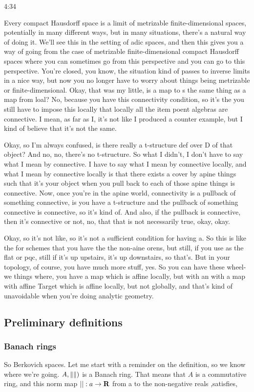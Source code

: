 \begin{unfinished}{4:34}
\begin{example}
Every compact Hausdorff space is a limit of metrizable finite-dimensional spaces, potentially in many different ways, but in many situations, there's a natural way of doing it. We'll see this in the setting of adic spaces, and then this gives you a way of going from the case of metrizable finite-dimensional compact Hausdorff spaces where you can sometimes go from this perspective and you can go to this perspective.
You're closed, you know, the situation kind of passes to inverse limits in a nice way, but now you no longer have to worry about things being metrizable or finite-dimensional. Okay, that was my little, is a map to s the same thing as a map from loal? No, because you have this connectivity condition, so it's the you still have to impose this locally that locally all the item poent algebras are connective. I mean, as far as I, it's not like I produced a counter example, but I kind of believe that it's not the same.

Okay, so I'm always confused, is there really a t-structure def over D of that object? And no, no, there's no t-structure. So what I didn't, I don't have to say what I mean by connective. I have to say what I mean by connective locally, and what I mean by connective locally is that there exists a cover by apine things such that it's your object when you pull back to each of those apine things is connective. Now, once you're in the apine world, connectivity is a pullback of something connective, is you have a t-structure and the pullback of something connective is connective, so it's kind of. And also, if the pullback is connective, then it's connective or not, no, that that is not necessarily true, okay, okay.

Okay, so it's not like, so it's not a sufficient condition for having a. So this is like the for schemes that you have the the non-aine orens, but still, if you use as the flat or pqc, still if it's up upstairs, it's up downstairs, so that's. But in your topology, of course, you have much more stuff, yes. So you can have these wheel-we things where, you have a map which is affine locally, but with an with a map with affine Target which is affine locally, but not globally, and that's kind of unavoidable when you're doing analytic geometry.

\subsection{Preliminary definitions}
\subsubsection{Banach rings}
So Berkovich spaces. Let me start with a reminder on the definition, so we know where we're going. $A, \left \lVert  \right \rVert)$ is a Banach ring. That means that $A$ is a commutative ring, and this norm map $||: a \rightarrow \mathbf R$  from a to the non-negative reals ,satisfies, 


\end{example}
\end{unfinished}
